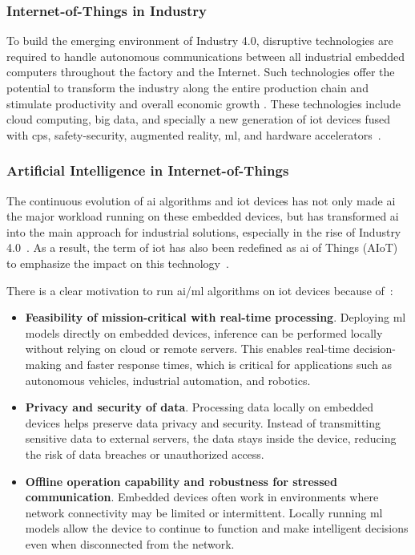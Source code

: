 \subsubsection{Internet-of-Things in Industry}
To build the emerging environment of Industry 4.0, disruptive technologies are required to handle autonomous communications between all industrial embedded computers throughout the factory and the Internet. Such technologies offer the potential to transform the industry along the entire production chain and stimulate productivity and overall economic growth \cite{espinoza2020estimating}. These technologies include cloud computing, big data, and specially a new generation of \gls{iot} devices fused with \gls{cps}, safety-security, augmented reality, \gls{ml}, and hardware accelerators~\cite{alcacer2019scanning}.

\subsubsection{Artificial Intelligence in Internet-of-Things}
The continuous evolution of \gls{ai} algorithms and \gls{iot} devices has not only made \gls{ai} the major workload running on these embedded devices, but has transformed \gls{ai} into the main approach for industrial solutions, especially in the rise of Industry 4.0~\cite{alcacer2019scanning}. As a result, the term of \gls{iot} has also been redefined as \gls{ai} of Things (AIoT) to emphasize the impact on this technology~\cite{zhang2020empowering}.

There is a clear motivation to run \gls{ai}/\gls{ml} algorithms on \gls{iot} devices because of~\cite{loh20201}:

\begin{itemize}
	\item \textbf{Feasibility of mission-critical with real-time processing}. Deploying \gls{ml} models directly on embedded devices, inference can be performed locally without relying on cloud or remote servers. This enables real-time decision-making and faster response times, which is critical for applications such as autonomous vehicles, industrial automation, and robotics.
	\item \textbf{Privacy and security of data}. Processing data locally on embedded devices helps preserve data privacy and security. Instead of transmitting sensitive data to external servers, the data stays inside the device, reducing the risk of data breaches or unauthorized access.
	\item \textbf{Offline operation capability and robustness for stressed communication}. Embedded devices often work in environments where network connectivity may be limited or intermittent. Locally running \gls{ml} models allow the device to continue to function and make intelligent decisions even when disconnected from the network.
\end{itemize}



